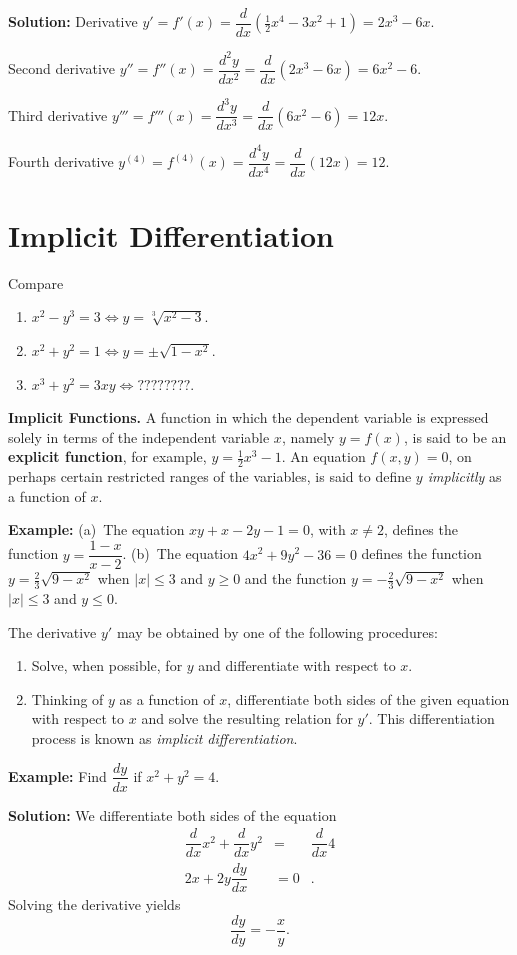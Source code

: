 \documentclass[titlepage,a4paper,12pt]{report}
\begin{document}
\noindent \textbf{Solution:} Derivative $y'=f'(x)=\dfrac{d}{dx}(\frac{1}{2}x^4-3x^2+1)=2x^3-6x$.

\noindent Second derivative $y''=f''(x)=\dfrac{d^2y}{dx^2}=\dfrac{d}{dx}(2x^3-6x)=6x^2-6$.

\noindent Third derivative $y'''=f'''(x)=\dfrac{d^3y}{dx^3}=\dfrac{d}{dx}(6x^2-6)=12x$.

\noindent Fourth derivative $y^{(4)}=f^{(4)}(x)=\dfrac{d^4y}{dx^4}=\dfrac{d}{dx}(12x)=12$.
\section{Implicit Differentiation}
Compare 
\begin{enumerate}
\item $x^2 -y^3 =3 \Longleftrightarrow y=\sqrt[3]{x^2-3}$.
\item $x^2+y^2=1 \Longleftrightarrow y=\pm \sqrt{1-x^2}$.
\item $x^3+y^2=3xy \Longleftrightarrow ????????$.
\end{enumerate}  
\textbf{Implicit Functions.} A function in which the dependent variable is expressed solely in terms of the independent variable $x$, namely $y=f(x)$, is said to be an \textbf{explicit function}, for example, $y=\frac{1}{2}x^3-1$. An equation $f(x,y)=0$, on perhaps certain restricted ranges of the variables, is said to define \textit{$y$ implicitly} as a function of $x$.

\noindent \textbf{Example:} (a)\, The equation $xy +x-2y-1=0$, with $x\neq 2$, defines the function $y=\dfrac{1-x}{x-2}$. \quad (b)\, The equation $4x^2+9y^2-36=0$ defines the function $y=\frac{2}{3}\sqrt{9-x^2}$ when $|x|\leq 3$ and $y\geq 0$ and the function $y=-\frac{2}{3}\sqrt{9-x^2}$ when $|x|\leq 3$ and $y\leq 0$.

\noindent The derivative $y'$ may be obtained by one of the following procedures:
\begin{enumerate}
\item Solve, when possible, for $y$ and differentiate with respect to $x$. 
\item Thinking of $y$ as a function of $x$, differentiate both sides of the given equation with respect to $x$ and solve the resulting relation for $y'$. This differentiation process is known as \textit{implicit differentiation}.
\end{enumerate}
\textbf{Example:} Find $\dfrac{dy}{dx}$ if $x^2+y^2=4$.

\noindent \textbf{Solution:} We differentiate both sides of the equation 
\begin{eqnarray*}
\dfrac{d}{dx}x^2 +\dfrac{d}{dx}y^2 &=& \dfrac{d}{dx} 4\\
2x +2y\dfrac{dy}{dx} &=0&.
\end{eqnarray*}
Solving the derivative yields
\[\dfrac{dy}{dy}=-\dfrac{x}{y}.\]
\end{document}
